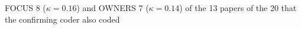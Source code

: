 FOCUS 8 ($\kappa = 0.16$) and OWNERS 7 ($\kappa = 0.14$) of the 13 papers of the 20 that the confirming coder also coded